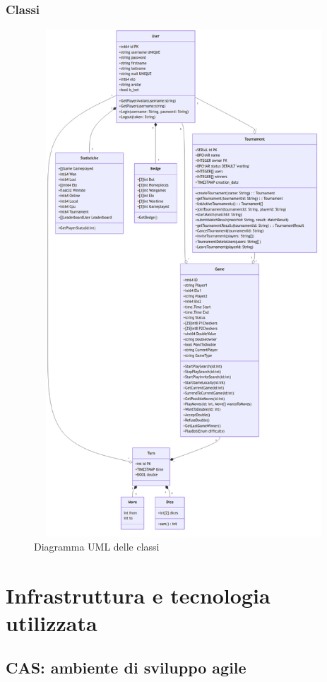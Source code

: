\documentclass{article}
\begin{document}
\subsubsection{Classi}
\begin{figure}[H]
    \centering
    \includegraphics[width=14cm, height=19cm]{uml-classes}
    \caption{Diagramma UML delle classi}
    \label{fig:class-diagram}
\end{figure}

\section{Infrastruttura e tecnologia utilizzata}

\subsection{CAS: ambiente di sviluppo agile}
\end{document}
